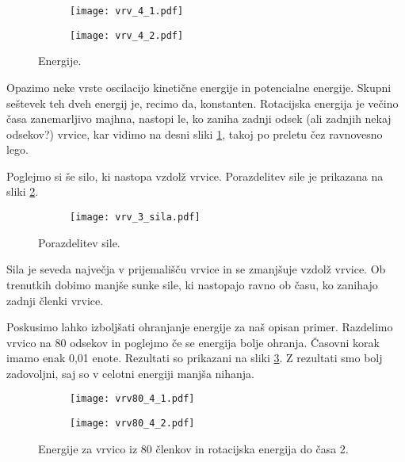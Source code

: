 \documentclass[12pt,a4paper]{article}
\begin{document}
\begin{figure}[H]
    \centering
    \begin{subfigure}[b]{0.45\textwidth}  			
        \texttt{[image: vrv\_4\_1.pdf]}
    \end{subfigure}
    \begin{subfigure}[b]{0.45\textwidth}  			
        \texttt{[image: vrv\_4\_2.pdf]}
    \end{subfigure}
    \caption{Energije.} \label{fig:slika3}
\end{figure}

\noindent Opazimo neke vrste oscilacijo kinetične energije in potencialne energije. Skupni seštevek teh dveh energij je, recimo da, konstanten. Rotacijska energija je večino časa zanemarljivo majhna, nastopi le, ko zaniha zadnji odsek (ali zadnjih nekaj odsekov?) vrvice, kar vidimo na desni sliki \ref{fig:slika3}, takoj po preletu čez ravnovesno lego.

Poglejmo si še silo, ki nastopa vzdolž vrvice. Porazdelitev sile je prikazana na sliki \ref{fig:slika4}.

\begin{figure}[H]
    \centering
    \begin{subfigure}[b]{0.45\textwidth}  			
        \texttt{[image: vrv\_3\_sila.pdf]}
    \end{subfigure}
    \caption{Porazdelitev sile.} \label{fig:slika4}
\end{figure}

\noindent Sila je seveda največja v prijemališču vrvice in se zmanjšuje vzdolž vrvice. Ob trenutkih dobimo manjše sunke sile, ki nastopajo ravno ob času, ko zanihajo zadnji členki vrvice.

Poskusimo lahko izboljšati ohranjanje energije za naš opisan primer. Razdelimo vrvico na 80 odsekov in poglejmo če se energija bolje ohranja. Časovni korak imamo enak 0,01 enote. Rezultati so prikazani na sliki \ref{fig:slika5}. Z rezultati smo bolj zadovoljni, saj so v celotni energiji manjša nihanja.

\begin{figure}[H]
    \centering
    \begin{subfigure}[b]{0.45\textwidth}  			
        \texttt{[image: vrv80\_4\_1.pdf]}
    \end{subfigure}
    \begin{subfigure}[b]{0.45\textwidth}  			
        \texttt{[image: vrv80\_4\_2.pdf]}
    \end{subfigure}
    \caption{Energije za vrvico iz 80 členkov in rotacijska energija do časa 2.} \label{fig:slika5}
\end{figure}
\end{document}

